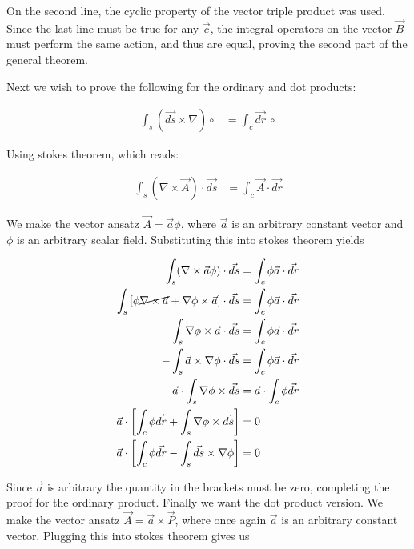 \documentclass[paper=a4, fontsize=11pt]{scrartcl} %
\numberwithin{equation}{section} %
\numberwithin{figure}{section} %
\numberwithin{table}{section} %
\begin{document}
On the second line, the cyclic property of the vector triple product was used. Since the last line must be true for any $\vec{c}$, the integral operators on the vector $\vec{B}$ must perform the same action, and thus are equal, proving the second part of the general theorem.

Next we wish to prove the following for the ordinary and dot products:

\begin{align}
\int_s (\vec{ds} \times \nabla) \circ &= \int_c \vec{dr}  \ \circ 
\end{align}

Using stokes theorem, which reads:

\begin{align}
\int_s (\nabla \times \vec{A})\cdot \vec{ds} &= \int_c \vec{A} \cdot \vec{dr}
\end{align}

We make the vector ansatz $\vec{A} = \vec{a}\phi$, where $\vec{a}$ is an arbitrary constant vector and $\phi$ is an arbitrary scalar field. Substituting this into stokes theorem yields

\begin{align}
\int_s (\nabla \times \vec{a}\phi) \cdot \vec{ds} &= \int_c \phi\vec{a} \cdot \vec{dr} \\
\int_s \left[\phi \cancel{\nabla \times \vec{a}} + \nabla \phi \times \vec{a} \right]\cdot \vec{ds} &= \int_c \phi\vec{a} \cdot \vec{dr} \\
\int_s \nabla \phi \times \vec{a} \cdot \vec{ds} &= \int_c \phi \vec{a} \cdot \vec{dr} \\
-\int_s \vec{a} \times \nabla \phi \cdot \vec{ds} &= \int_c \phi \vec{a} \cdot \vec{dr} \\
-\vec{a} \cdot \int_s \nabla \phi \times \vec{ds} &= \vec{a} \cdot \int_c \phi \vec{dr} \\
\vec{a} \cdot \left[\int_c \phi \vec{dr} + \int_s \nabla \phi \times \vec{ds}\right] &=  0 \\
\vec{a} \cdot \left[\int_c \phi \vec{dr} - \int_s \vec{ds} \times \nabla \phi\right] &=  0 \\
\end{align}

Since $\vec{a}$ is arbitrary the quantity in the brackets must be zero, completing the proof for the ordinary product. Finally we want the dot product version. We make the vector ansatz $\vec{A} = \vec{a} \times \vec{P}$, where once again $\vec{a}$ is an arbitrary constant vector. Plugging this into stokes theorem gives us
\end{document}
